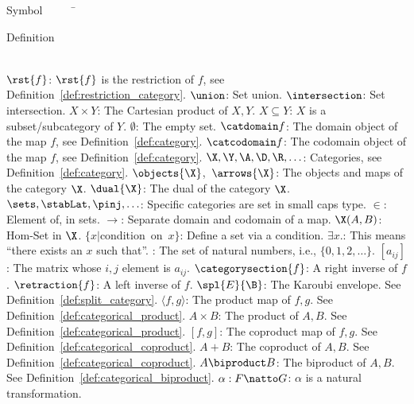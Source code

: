 


\begin{tabbing}
Symbol~~~~~\= \ \ \ \ \ \ \ \ \ \ \ \ \ \ \ \ \ \ \ \ \ \ \ \ \ \ \ \ \ \ \ \ \ \ \ \  \parbox{5in}{Definition}\\

\addsymbol \mbox{$\rst{f}$}: {$\rst{f}$ is the restriction of $f$, see Definition~\ref{def:restriction_category}.}
\addsymbol \mbox{$\union$}: {Set union.}
\addsymbol \mbox{$\intersection$}: {Set intersection.}
\addsymbol \mbox{$X\times Y$}: {The Cartesian product of $X,Y$.}
\addsymbol \mbox{$X\subseteq Y$}: {$X$ is a subset/subcategory of $Y$.}
\addsymbol \mbox{$\emptyset$}: {The empty set.}
\addsymbol \mbox{$\catdomain f$}: {The domain object of the map $f$, see Definition~\ref{def:category}.}
\addsymbol \mbox{$\catcodomain f$}: {The codomain object of the map $f$, see Definition~\ref{def:category}.}
\addsymbol \mbox{$\X,\Y, \A,\D,\R,\ldots$}: {Categories, see Definition~\ref{def:category}.}
\addsymbol \mbox{$\objects{\X}$, $\arrows{\X}$}: {The objects and maps of the category $\X$.}
\addsymbol \mbox{$\dual{\X}$}: {The dual of the category $\X$.}
\addsymbol \mbox{$\sets, \stabLat, \pinj,\ldots$}: {Specific categories are set in small caps type.}
\addsymbol \mbox{$\in$}: {Element of, in sets.}
\addsymbol \mbox{$\to$}: {Separate domain and codomain of a map.}
\addsymbol \mbox{$\X(A,B)$}: {Hom-Set in $\X$.}
\addsymbol \mbox{$\{x | $condition on $x\}$}: {Define a set via a condition.}
\addsymbol \mbox{$\exists x.$}: {This means ``there exists an $x$ such that''.}
\addsymbol \mbox{\nat}: {The set of natural numbers, i.e., $\{0,1,2,\ldots\}$.}
\addsymbol \mbox{$[a_{i j}]$}: {The matrix whose $i,j$ element is $a_{i j}$.}
\addsymbol \mbox{$\categorysection{f}$}: {A right inverse of $f$.}
\addsymbol \mbox{$\retraction{f}$}: {A left inverse of $f$.}
\addsymbol \mbox{$\spl{E}{\B}$}: {The Karoubi envelope. See  Definition~\ref{def:split_category}.}
\addsymbol \mbox{$\langle f,g\rangle$}: {The product map of $f,g$. See Definition~\ref{def:categorical_product}.}
\addsymbol \mbox{$A\times B$}: {The product of $A,B$. See Definition~\ref{def:categorical_product}.}
\addsymbol \mbox{$[f,g]$}: {The coproduct map of $f,g$. See Definition~\ref{def:categorical_coproduct}.}
\addsymbol \mbox{$A+B$}: {The coproduct of $A,B$. See Definition~\ref{def:categorical_coproduct}.}
\addsymbol \mbox{$A\biproduct B$}: {The biproduct of $A,B$. See Definition~\ref{def:categorical_biproduct}.}
\addsymbol \mbox{$\alpha: F\natto G$}: {$\alpha$ is a natural transformation.}

\end{tabbing}
